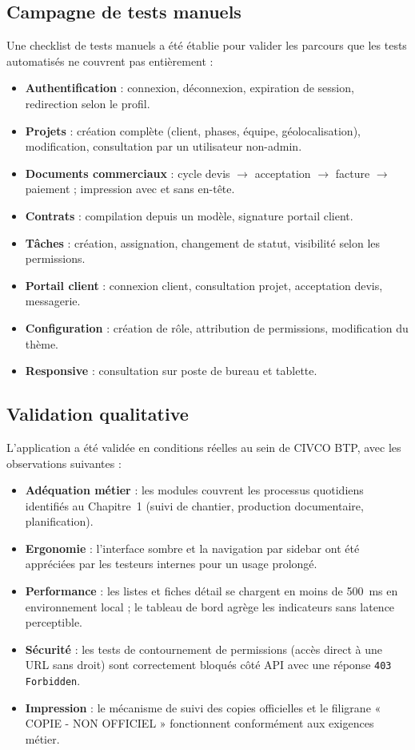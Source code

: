 \subsection{Campagne de tests manuels}

Une checklist de tests manuels a été établie pour valider les parcours que les tests
automatisés ne couvrent pas entièrement :

\begin{itemize}
  \item \textbf{Authentification} : connexion, déconnexion, expiration de session,
  redirection selon le profil.
  \item \textbf{Projets} : création complète (client, phases, équipe, géolocalisation),
  modification, consultation par un utilisateur non-admin.
  \item \textbf{Documents commerciaux} : cycle devis $\rightarrow$ acceptation $\rightarrow$
  facture $\rightarrow$ paiement ; impression avec et sans en-tête.
  \item \textbf{Contrats} : compilation depuis un modèle, signature portail client.
  \item \textbf{Tâches} : création, assignation, changement de statut, visibilité
  selon les permissions.
  \item \textbf{Portail client} : connexion client, consultation projet, acceptation
  devis, messagerie.
  \item \textbf{Configuration} : création de rôle, attribution de permissions,
  modification du thème.
  \item \textbf{Responsive} : consultation sur poste de bureau et tablette.
\end{itemize}

\subsection{Validation qualitative}

L'application a été validée en conditions réelles au sein de CIVCO BTP, avec les
observations suivantes :

\begin{itemize}
  \item \textbf{Adéquation métier} : les modules couvrent les processus quotidiens
  identifiés au Chapitre~1 (suivi de chantier, production documentaire, planification).
  \item \textbf{Ergonomie} : l'interface sombre et la navigation par sidebar ont été
  appréciées par les testeurs internes pour un usage prolongé.
  \item \textbf{Performance} : les listes et fiches détail se chargent en moins de
  500~ms en environnement local ; le tableau de bord agrège les indicateurs sans
  latence perceptible.
  \item \textbf{Sécurité} : les tests de contournement de permissions (accès direct
  à une URL sans droit) sont correctement bloqués côté API avec une réponse
  \texttt{403 Forbidden}.
  \item \textbf{Impression} : le mécanisme de suivi des copies officielles et le
  filigrane « COPIE - NON OFFICIEL » fonctionnent conformément aux exigences métier.
\end{itemize}

